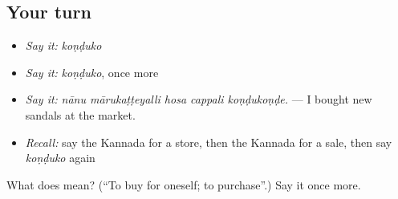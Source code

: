 \subsection*{Your turn}
\begin{itemize}
\raggedright
  \item \emph{Say it:} \emph{koṇḍuko}
  \item \emph{Say it:} \emph{koṇḍuko}, once more
  \item \emph{Say it:} \emph{nānu mārukaṭṭeyalli hosa cappali koṇḍukoṇḍe.} — I bought new sandals at the market.
  \item \emph{Recall:} say the Kannada for a store, then the Kannada for a sale, then say \emph{koṇḍuko} again
\end{itemize}

\begin{tcolorbox}[breakable,colback=teal!4,colframe=teal!35!black,title={Before you move on}]
What does  mean? (\textquotedblleft{}To buy for oneself; to purchase\textquotedblright{}.) Say it once more.
\end{tcolorbox}
